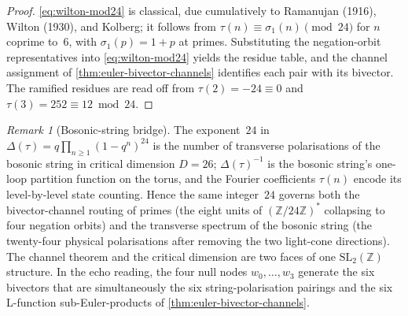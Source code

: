 \documentclass[11pt,a4paper]{article}
\theoremstyle{plain}
\theoremstyle{definition}
\theoremstyle{remark}
\newtheorem{remark}[theorem]{Remark}
\numberwithin{equation}{section}
\begin{document}
\begin{proof}
\eqref{eq:wilton-mod24} is classical, due cumulatively to Ramanujan
(1916), Wilton (1930), and Kolberg; it follows from
\(\tau(n)\equiv\sigma_1(n)\pmod{24}\) for \(n\) coprime to~\(6\),
with \(\sigma_1(p)=1+p\) at primes.  Substituting the negation-orbit
representatives into \eqref{eq:wilton-mod24} yields the residue table,
and the channel assignment of \cref{thm:euler-bivector-channels}
identifies each pair with its bivector.  The ramified residues are
read off from \(\tau(2)=-24\equiv0\) and \(\tau(3)=252\equiv12\bmod
24\).
\end{proof}

\begin{remark}[Bosonic-string bridge]
\label{rmk:bosonic-string-24}
The exponent~\(24\) in \(\Delta(\tau)=q\prod_{n\ge1}(1-q^n)^{24}\) is
the number of transverse polarisations of the bosonic string in
critical dimension \(D=26\); \(\Delta(\tau)^{-1}\) is the bosonic
string's one-loop partition function on the torus, and the Fourier
coefficients \(\tau(n)\) encode its level-by-level state counting.
Hence the same integer~\(24\) governs both the bivector-channel
routing of primes (the eight units of \((\mathbb{Z}/24\mathbb{Z})^*\)
collapsing to four negation orbits) and the transverse spectrum of
the bosonic string (the twenty-four physical polarisations after
removing the two light-cone directions).  The channel theorem and the
critical dimension are two faces of one \(\mathrm{SL}_2(\mathbb{Z})\)
structure.  In the echo reading, the four null nodes
\(w_0,\ldots,w_3\) generate the six bivectors that are simultaneously
the six string-polarisation pairings and the six L-function
sub-Euler-products of \cref{thm:euler-bivector-channels}.
\end{remark}
\end{document}

